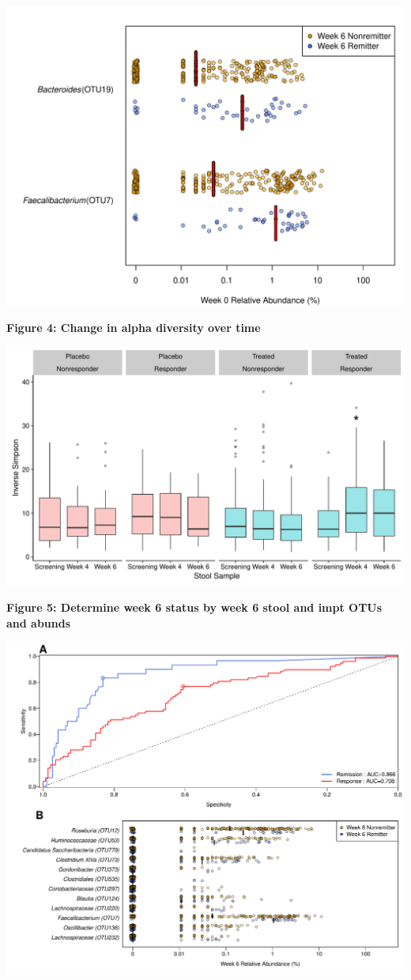 \documentclass[11pt,]{article}
\begin{document}
\includegraphics{figures/Figure3_basesigOTUabund.REMISSwk6.pdf}

\newpage

\textbf{Figure 4: Change in alpha diversity over time}

\includegraphics{figures/Figure4_wk046.adivXvisitXindtrtXrelRSPwk22.pdf}

\newpage

\textbf{Figure 5: Determine week 6 status by week 6 stool and impt OTUs
and abunds}

\includegraphics{figures/Figure5_wk6Xwk6.pdf}
\end{document}
